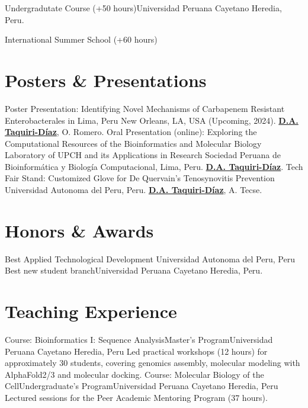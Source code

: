 \documentclass[11pt,a4paper,sans]{moderncv}
\begin{document}
  {Undergradutate Course (+50 hours)}{Universidad Peruana Cayetano Heredia, Peru.}{}
  {}

  {International Summer School (+60 hours)}{}{}
  {}

\section{Posters \& Presentations}

  {Poster Presentation: Identifying Novel Mechanisms of Carbapenem Resistant Enterobacterales in Lima, Peru}
  {New Orleans, LA, USA (Upcoming, 2024). \textbf{\underline{D.A. Taquiri-Díaz}}, O. Romero.}{}
  {}
  {Oral Presentation (online): Exploring the Computational Resources of the Bioinformatics and Molecular Biology Laboratory of UPCH and its Applications in Research}
  {Sociedad Peruana de Bioinformática y Biología Computacional, Lima, Peru. \textbf{\underline{D.A. Taquiri-Díaz}}.}{}
  {}
  {Tech Fair Stand: Customized Glove for De Quervain's Tenosynovitis Prevention}
  {Universidad Autonoma del Peru, Peru. \textbf{\underline{D.A. Taquiri-Díaz}}, A. Tecse.}{}
  {}


\section{Honors \& Awards}
  {Best Applied Technological Development}
  {Universidad Autonoma del Peru, Peru}{}
  {}
  {Best new student branch}{Universidad Peruana Cayetano Heredia, Peru.}{}
  {}

\section{Teaching Experience}
    {Course: Bioinformatics I: Sequence Analysis}{Master’s Program}{Universidad Peruana Cayetano Heredia, Peru}
    {Led practical workshops (12 hours) for approximately 30 students, covering genomics assembly, molecular modeling with AlphaFold2/3 and molecular docking.
    }
    {Course: Molecular Biology of the Cell}{Undergraduate’s Program}{Universidad Peruana Cayetano Heredia, Peru}
    {Lectured sessions for the Peer Academic Mentoring Program (37 hours). 
    }
\end{document}

